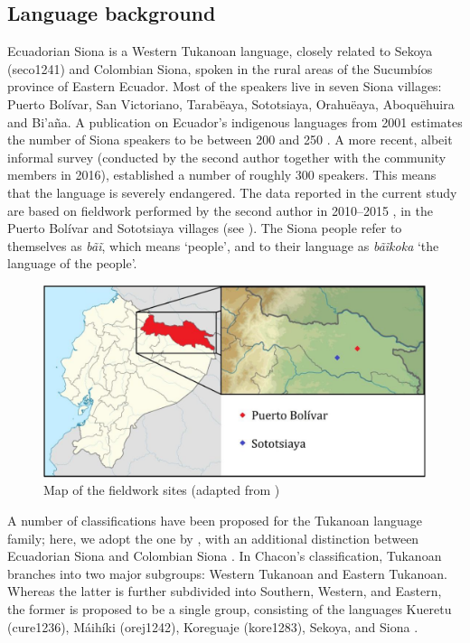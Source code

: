\documentclass[output=paper]{langscibook}
\begin{document}
\subsection{Language background}\label{sec-LangBG}
\largerpage
Ecuadorian Siona is a Western Tukanoan language, closely related to Sekoya (seco1241) and Colombian Siona, spoken in the rural areas of the Sucumb\'ios province of Eastern Ecuador. Most of the speakers live in seven Siona villages: Puerto Bol\'ivar, San Victoriano, Tarab\"eaya, Sototsiaya, Orahu\"eaya, Aboqu\"ehuira and Bi'aña. A publication on Ecuador's indigenous languages from 2001 estimates the number of Siona speakers to be between 200 and 250 \citep{Mejeant:2001}. A more recent, albeit  informal survey (conducted by the second author together with the community members in 2016), established a number of roughly 300 speakers. This means that the language is severely endangered. The data reported in the current study are based on fieldwork performed by the second author in 2010--2015 \citep{Bruil:2014}, in the Puerto Bol\'ivar and Sototsiaya villages (see ). The Siona people refer to themselves as \textit{bãĩ}, which means `people', and to their language as \textit{bãĩkoka} `the language of the people'.


\begin{figure}
\includegraphics[height=.3\textheight]{figures/Picture1.png}
\caption{Map of the fieldwork sites (adapted from \citealt[5]{Bruil:2014})}
\label{fig-villages}
\end{figure}


A number of classifications have been proposed for the Tukanoan language family; here, we adopt the one by \citet{Chacon:2014}, with an additional distinction between Ecuadorian Siona and Colombian Siona \citep[11]{Bruil:2014}. In Chacon's classification, Tukanoan branches into two major subgroups: Western Tukanoan and Eastern Tukanoan. Whereas the latter is further subdivided into Southern, Western, and Eastern, the former is proposed to be a single group, consisting of the languages Kueretu (cure1236), M\'aih\'iki (orej1242), Koreguaje (kore1283), Sekoya, and Siona \citep{Chacon:2014}. 
\end{document}
